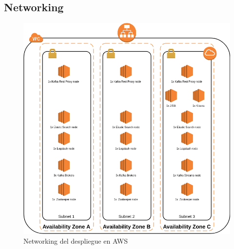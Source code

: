 \subsection{Networking}

\begin{figure}[!htb]
	\includegraphics[width=\linewidth] {Moduloss-netdeploy.png}
	\caption{Networking del despliegue en AWS}
	\label{fig:networking1}
\end{figure}

